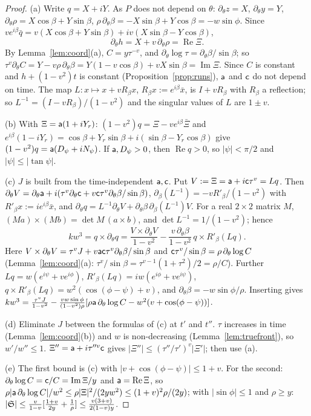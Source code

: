 \begin{proof}
(a) Write $q=X+iY$. As $P$ does not depend on $\theta$: $\partial_\theta z=X$, $\partial_\theta y=Y$,
$\partial_\theta\rho=X\cos\beta+Y\sin\beta$, $\rho\,\partial_\theta\beta=-X\sin\beta+Y\cos\beta=-w\sin\phi$. Since
$ve^{i\beta}\bar q=v(X\cos\beta+Y\sin\beta)+iv(X\sin\beta-Y\cos\beta)$,
\[
\partial_\theta h=X+v\,\partial_\theta\rho=\operatorname{Re}\Xi .
\]
By Lemma~\ref{lem:coord}(a), $C=y\tau^{-v}$, and $\partial_\theta\log\tau=\partial_\theta\beta/\sin\beta$; so
$\tau^v\partial_\theta C=Y-v\rho\,\partial_\theta\beta=Y(1-v\cos\beta)+vX\sin\beta=\operatorname{Im}\Xi$. Since $C$ is constant and
$h+(1-v^2)t$ is constant (Proposition~\ref{prop:runs}), $\mathsf a$ and $\mathsf c$ do not depend on time. The map
$L:x\mapsto x+vR_\beta x$, $R_\beta x:=e^{i\beta}\bar x$, is $I+vR_\beta$ with $R_\beta$ a reflection; so $L^{-1}=(I-vR_\beta)/(1-v^2)$
and the singular values of $L$ are $1\pm v$.

(b) With $\Xi=\mathsf a(1+iY_r)$: $(1-v^2)q=\Xi-ve^{i\beta}\bar\Xi$ and
$e^{i\beta}(1-iY_r)=\cos\beta+Y_r\sin\beta+i(\sin\beta-Y_r\cos\beta)$ give $(1-v^2)q=\mathsf a(D_\psi+iN_\psi)$. If $\mathsf a,D_\psi>0$, then
$\operatorname{Re}q>0$, so $|\psi|<\pi/2$ and $|\psi|\le|\tan\psi|$.

(c) $J$ is built from the time-independent $\mathsf a,\mathsf c$. Put $V:=\Xi=\mathsf a+i\mathsf c\tau^v=Lq$. Then
$\partial_\theta V=\partial_\theta\mathsf a+i(\tau^v\partial_\theta\mathsf c+v\mathsf c\tau^v\partial_\theta\beta/\sin\beta)$,
$\partial_\beta(L^{-1})=-vR'_\beta/(1-v^2)$ with $R'_\beta x:=ie^{i\beta}\bar x$, and
$\partial_\theta q=L^{-1}\partial_\theta V+\partial_\theta\beta\,\partial_\beta(L^{-1})V$. For a real $2\times2$ matrix $M$,
$(Ma)\times(Mb)=\det M\,(a\times b)$, and $\det L^{-1}=1/(1-v^2)$; hence
\[
kw^3=q\times\partial_\theta q=\frac{V\times\partial_\theta V}{1-v^2}-\frac{v\,\partial_\theta\beta}{1-v^2}\,q\times R'_\beta(Lq).
\]
Here $V\times\partial_\theta V=\tau^vJ+v\mathsf a\mathsf c\tau^v\partial_\theta\beta/\sin\beta$ and $\mathsf c\tau^v/\sin\beta=\rho\,\partial_\theta\log C$
(Lemma~\ref{lem:coord}(a): $\tau^v/\sin\beta=\tau^{v-1}(1+\tau^2)/2=\rho/C$). Further $Lq=w(e^{i\psi}+ve^{i\phi})$,
$R'_\beta(Lq)=iw(e^{i\phi}+ve^{i\psi})$, $q\times R'_\beta(Lq)=w^2(\cos(\phi-\psi)+v)$, and $\partial_\theta\beta=-w\sin\phi/\rho$.
Inserting gives
$kw^3=\frac{\tau^vJ}{1-v^2}-\frac{vw\sin\phi}{(1-v^2)\rho}[\rho\mathsf a\,\partial_\theta\log C-w^2(v+\cos(\phi-\psi))]$.

(d) Eliminate $J$ between the formulas of (c) at $t'$ and $t''$. $\tau$ increases in time (Lemma~\ref{lem:coord}(b)) and $w$ is
non-decreasing (Lemma~\ref{lem:truefront}), so $w'/w''\le1$. $\Xi''=\mathsf a+i\tau''^v\mathsf c$ gives $|\Xi''|\le(\tau''/\tau')^v|\Xi'|$; then use
(a).

(e) The first bound is (c) with $|v+\cos(\phi-\psi)|\le1+v$. For the second: $\partial_\theta\log C=\mathsf c/C=\operatorname{Im}\Xi/y$ and
$\mathsf a=\operatorname{Re}\Xi$, so $\rho|\mathsf a\,\partial_\theta\log C|/w^2\le\rho|\Xi|^2/(2yw^2)\le(1+v)^2\rho/(2y)$; with $|\sin\phi|\le1$ and
$\rho\ge y$: $|\mathfrak S|\le\frac v{1-v}[\frac{1+v}{2y}+\frac1\rho]\le\frac{v(3+v)}{2(1-v)y}$.
\end{proof}


